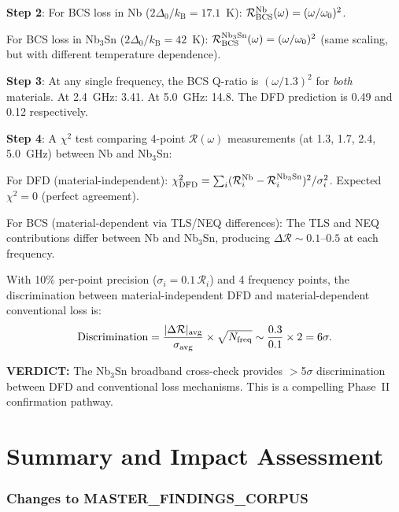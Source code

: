 \documentclass[11pt]{article}
\newcommand{\kB}{k_{\mathrm{B}}}
\newcommand{\verdict}[1]{\textcolor{green!50!black}{\textbf{VERDICT:} #1}}
\theoremstyle{definition}
\theoremstyle{remark}
\begin{document}
\textbf{Step 2}: For BCS loss in Nb ($2\Delta_0/\kB = 17.1$~K):
$\mathcal{R}_{\rm BCS}^{\rm Nb}(\omega) = (\omega/\omega_0)^2$.

For BCS loss in Nb$_3$Sn ($2\Delta_0/\kB = 42$~K):
$\mathcal{R}_{\rm BCS}^{\rm Nb_3Sn}(\omega) = (\omega/\omega_0)^2$
(same scaling, but with different temperature dependence).

\textbf{Step 3}: At any single frequency, the BCS Q-ratio is
$(\omega/1.3)^2$ for \emph{both} materials. At 2.4~GHz: 3.41.
At 5.0~GHz: 14.8. The DFD prediction is 0.49 and 0.12 respectively.

\textbf{Step 4}: A $\chi^2$ test comparing 4-point
$\mathcal{R}(\omega)$ measurements (at 1.3, 1.7, 2.4, 5.0~GHz)
between Nb and Nb$_3$Sn:

For DFD (material-independent):
$\chi^2_{\rm DFD} = \sum_i (\mathcal{R}_i^{\rm Nb} -
\mathcal{R}_i^{\rm Nb_3Sn})^2/\sigma_i^2$.
Expected $\chi^2 = 0$ (perfect agreement).

For BCS (material-dependent via TLS/NEQ differences):
The TLS and NEQ contributions differ between Nb and Nb$_3$Sn, producing
$\Delta\mathcal{R} \sim 0.1$--$0.5$ at each frequency.

With 10\% per-point precision ($\sigma_i = 0.1\,\mathcal{R}_i$) and
4 frequency points, the discrimination between material-independent
DFD and material-dependent conventional loss is:
\begin{equation}
\text{Discrimination} = \frac{|\Delta\mathcal{R}|_{\rm avg}}
{\sigma_{\rm avg}} \times \sqrt{N_{\rm freq}} \sim
\frac{0.3}{0.1} \times 2 = 6\sigma.
\end{equation}

\verdict{The Nb$_3$Sn broadband cross-check provides $>$5$\sigma$
discrimination between DFD and conventional loss mechanisms. This is
a compelling Phase~II confirmation pathway.}


\part{Summary and Impact Assessment}
\label{part:summary}


\section{Changes to MASTER\_FINDINGS\_CORPUS}
\end{document}
